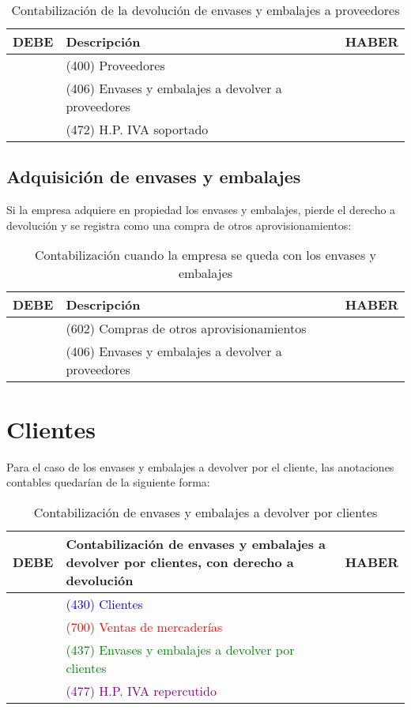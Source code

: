\documentclass{article}
\begin{document}
\begin{table}[H]
\centering
\begin{tabular}{|p{4cm}|p{4cm}|p{4cm}|}
\hline
\textbf{DEBE} & \textbf{Descripción} & \textbf{HABER} \\
\hline
& (400) Proveedores & \\
&  (406) Envases y embalajes a devolver a proveedores & \\
&  (472) H.P. IVA soportado & \\
\hline
\end{tabular}
\caption{Contabilización de la devolución de envases y embalajes a proveedores}
\end{table}

\subsection*{Adquisición de envases y embalajes}

Si la empresa adquiere en propiedad los envases y embalajes, pierde el derecho a devolución y se registra como una compra de otros aprovisionamientos:

\begin{table}[H]
\centering
\begin{tabular}{|p{4cm}|p{4cm}|p{4cm}|}
\hline
\textbf{DEBE} & \textbf{Descripción} & \textbf{HABER} \\
\hline
& (602) Compras de otros aprovisionamientos & \\
&  (406) Envases y embalajes a devolver a proveedores & \\
\hline
\end{tabular}
\caption{Contabilización cuando la empresa se queda con los envases y embalajes}
\end{table}

\section*{Clientes}

Para el caso de los envases y embalajes a devolver por el cliente, las anotaciones contables quedarían de la siguiente forma:

\begin{table}[H]
\centering
\begin{tabular}{|p{4cm}|p{4cm}|p{4cm}|}
\hline
\textbf{DEBE} & \textbf{Contabilización de envases y embalajes a devolver por clientes, con derecho a devolución} & \textbf{HABER} \\
\hline
& \textcolor{blue}{(430) Clientes} & \\
& \textcolor{red}{(700) Ventas de mercaderías} & \\
& \textcolor{green}{(437) Envases y embalajes a devolver por clientes} & \\
& \textcolor{purple}{(477) H.P. IVA repercutido} & \\
\hline
\end{tabular}
\caption{Contabilización de envases y embalajes a devolver por clientes}
\end{table}
\end{document}
